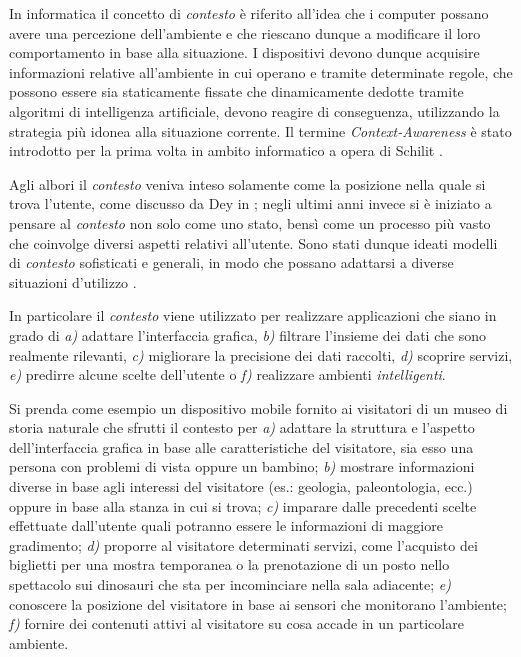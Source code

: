 In informatica il concetto di \emph{contesto} è riferito all'idea che i computer possano avere una percezione dell'ambiente e che riescano dunque a modificare il loro comportamento in base alla situazione. I dispositivi devono dunque acquisire informazioni relative all'ambiente in cui operano e tramite determinate regole, che possono essere sia staticamente fissate che dinamicamente dedotte tramite algoritmi di intelligenza artificiale, devono reagire di conseguenza, utilizzando la strategia più idonea alla situazione corrente. Il termine \emph{Context-Awareness} è stato introdotto per la prima volta in ambito informatico a opera di Schilit \cite{schilit1994context}\cite{schilit1994disseminating}.

Agli albori il \emph{contesto} veniva inteso solamente come la posizione nella quale si trova l'utente, come discusso da Dey in \cite{dey2001understanding}; negli ultimi anni invece si è iniziato a pensare al \emph{contesto} non solo come uno stato, bensì come un processo più vasto che coinvolge diversi aspetti relativi all'utente. Sono stati dunque ideati modelli di \emph{contesto} sofisticati e generali, in modo che possano adattarsi a diverse situazioni d'utilizzo \cite{DBLP:journals/sigmod/BolchiniCQST07} \cite{baldauf2007survey}.

In particolare il \emph{contesto} viene utilizzato per realizzare applicazioni che siano in grado di \emph{a)} adattare l'interfaccia grafica, \emph{b)} filtrare l'insieme dei dati che sono realmente rilevanti, \emph{c)} migliorare la precisione dei dati raccolti, \emph{d)} scoprire servizi, \emph{e)} predirre alcune scelte dell'utente o \emph{f)} realizzare ambienti \emph{intelligenti}.

Si prenda come esempio un dispositivo mobile fornito ai visitatori di un museo di storia naturale che sfrutti il contesto per \emph{a)} adattare la struttura e l'aspetto dell'interfaccia grafica in base alle caratteristiche del visitatore, sia esso una persona con problemi di vista oppure un bambino; \emph{b)} mostrare informazioni diverse in base agli interessi del visitatore (es.: geologia, paleontologia, ecc.) oppure in base alla stanza in cui si trova; \emph{c)} imparare dalle precedenti scelte effettuate dall'utente quali potranno essere le informazioni di maggiore gradimento; \emph{d)} proporre al visitatore determinati servizi, come l'acquisto dei biglietti per una mostra temporanea o la prenotazione di un posto nello spettacolo sui dinosauri che sta per incominciare nella sala adiacente; \emph{e)} conoscere la posizione del visitatore in base ai sensori che monitorano l'ambiente; \emph{f)} fornire dei contenuti attivi al visitatore su cosa accade in un particolare ambiente.

